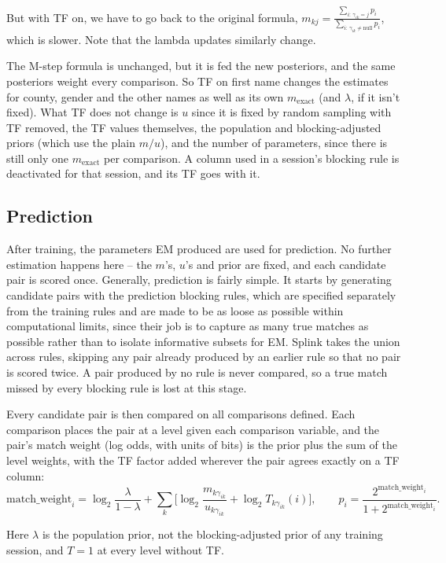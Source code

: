 \documentclass[11pt]{article}
\begin{document}
But with TF on, we have to go back to the original formula, $m_{kj} = \frac{\sum_{i:\,\gamma_{ik}=j} p_i}{\sum_{i:\,\gamma_{ik}\neq\text{null}} p_i}$, which is slower. Note that the lambda updates similarly change.

The M-step formula is unchanged, but it is fed the new posteriors, and the same posteriors weight every comparison. So TF on first name changes the estimates for county, gender and the other names as well as its own $m_{\text{exact}}$ (and $\lambda$, if it isn't fixed). What TF does not change is $u$ since it is fixed by random sampling with TF removed, the TF values themselves, the population and blocking-adjusted priors (which use the plain $m/u$), and the number of parameters, since there is still only one $m_{\text{exact}}$ per comparison. A column used in a session's blocking rule is deactivated for that session, and its TF goes with it.

\subsection{Prediction}

After training, the parameters EM produced are used for prediction. No further estimation happens here -- the $m$'s, $u$'s and prior are fixed, and each candidate pair is scored once. Generally, prediction is fairly simple. It starts by generating candidate pairs with the prediction blocking rules, which are specified separately from the training rules and are made to be as loose as possible within computational limits, since their job is to capture as many true matches as possible rather than to isolate informative subsets for EM. Splink takes the union across rules, skipping any pair already produced by an earlier rule so that no pair is scored twice. A pair produced by no rule is never compared, so a true match missed by every blocking rule is lost at this stage.

Every candidate pair is then compared on all comparisons defined. Each comparison places the pair at a level given each comparison variable, and the pair's match weight (log odds, with units of bits) is the prior plus the sum of the level weights, with the TF factor added wherever the pair agrees exactly on a TF column:
\[
\text{match\_weight}_i = \log_2\frac{\lambda}{1-\lambda} + \sum_k \Big[\log_2\frac{m_{k\gamma_{ik}}}{u_{k\gamma_{ik}}} + \log_2 T_{k\gamma_{ik}}(i)\Big], \qquad p_i = \frac{2^{\text{match\_weight}_i}}{1 + 2^{\text{match\_weight}_i}}.
\]

Here $\lambda$ is the population prior, not the blocking-adjusted prior of any training session, and $T = 1$ at every level without TF.
\end{document}
